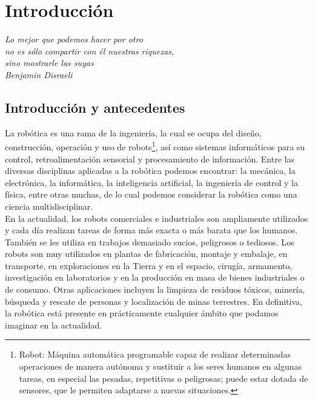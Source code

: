 

\chapter{Introducción}
\label{chap:introducción}

\emph{Lo mejor que podemos hacer por otro\\ no es sólo compartir con él nuestras riquezas,\\ sino mostrarle las suyas\\ Benjamin Disraeli}\\


\section{Introducción y antecedentes}
\label{sec:introduccion_y_antecedentes}

La robótica es una rama de la ingeniería, la cual se ocupa del diseño, construcción, operación y uso de robots\footnote{Robot: Máquina automática programable capaz de 
realizar determinadas operaciones de manera autónoma y sustituir a los seres humanos en algunas tareas, en especial las pesadas, repetitivas o peligrosas; puede estar dotada de sensores, 
que le permiten adaptarse a nuevas situaciones.}, así como sistemas informáticos para su control, retroalimentación sensorial y procesamiento de información. Entre las diversas disciplinas aplicadas
a la robótica podemos encontrar: la mecánica, la electrónica, la informática, la inteligencia artificial, la ingeniería de control y la física, entre otras muchas, de lo cual podemos considerar 
la robótica como una ciencia multidisciplinar.\\

En la actualidad, los robots comerciales e industriales son ampliamente utilizados y cada día realizan tareas de forma más exacta o más barata que los humanos. También se les utiliza en trabajos demasiado sucios,
peligrosos o tediosos. Los robots son muy utilizados en plantas de fabricación, montaje y embalaje, en transporte, en exploraciones en la Tierra y en el espacio, cirugía, armamento, investigación en laboratorios y 
en la producción en masa de bienes industriales o de consumo. Otras aplicaciones incluyen la limpieza de residuos tóxicos, minería, búsqueda y rescate de personas y localización de minas terrestres. En definitiva, 
la robótica está presente en prácticamente cualquier ámbito que podamos imaginar en la actualidad.\\

